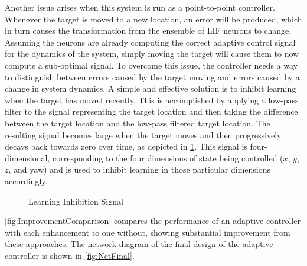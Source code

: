 \documentclass[letterpaper, 10 pt, conference]{ieeeconf}  %
\begin{document}
Another issue arises when this system is run as a point-to-point controller.
Whenever the target is moved to a new location, an error will be produced, which in turn causes the transformation from the ensemble of LIF neurons to change.
Assuming the neurons are already computing the correct adaptive control signal for the dynamics of the system, simply moving the target will cause them to now compute a sub-optimal signal.
To overcome this issue, the controller needs a way to distinguish between errors caused by the target moving and errors caused by a change in system dynamics.
A simple and effective solution is to inhibit learning when the target has moved recently.
This is accomplished by applying a low-pass filter to the signal representing the target location and then taking the difference between the target location and the low-pass filtered target location.
The resulting signal becomes large when the target moves and then progressively decays back towards zero over time, as depicted in \ref{fig:TMCSignal}.
This signal is four-dimensional, corresponding to the four dimensions of state being controlled ($x$, $y$, $z$, and yaw) and is used to inhibit learning in those particular dimensions accordingly.

\begin{figure}
\centering
\caption{Learning Inhibition Signal}
\label{fig:TMCSignal}
\end{figure}

\ref{fig:ImprovementComparison} compares the performance of an adaptive controller with each enhancement to one without, showing substantial improvement from these approaches.
The network diagram of the final design of the adaptive controller is shown in \ref{fig:NetFinal}.
\end{document}
